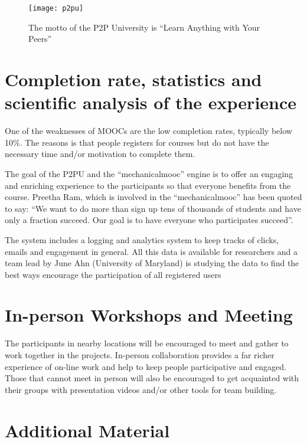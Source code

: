 \documentclass[oneside]{book}   %
\begin{document}
\begin{figure}
\begin{center}
\texttt{[image: p2pu]}
\caption{The motto of the P2P University is ``Learn Anything with Your Peers''}
\label{fig:p2pu}
\end{center}
\end{figure}

\section{Completion rate, statistics and scientific analysis of the experience}

One of the weaknesses of MOOCs are the low completion rates, typically below 10\%.
The reasons is that people registers for courses but do not have the necessary time and/or motivation to complete them.

The goal of the P2PU and the ``mechanicalmooc'' engine is to offer an engaging and enriching experience to the participants so that everyone benefits from the course.
Preetha Ram, which is involved in the ``mechanicalmooc'' has been quoted to say: ``We want to do more than sign up tens of thousands of students and have only a fraction succeed. Our goal is to have everyone who participates succeed''.

The system includes a logging and analytics system to keep tracks of clicks, emails and engagement in general.
All this data is available for researchers and a team lead by June Ahn (University of Maryland) is studying the data to find the best ways encourage the participation of all registered users \cite{ahn2013dop}

\section{In-person Workshops and Meeting}

The participants in nearby locations will be encouraged to meet and gather to work together in the projects.
In-person collaboration provides a far richer experience of on-line work and help to keep people participative and engaged.
Those that cannot meet in person will also be encouraged to get acquainted with their groups with presentation videos and/or other tools for team building.

\section{Additional Material}
\end{document}
